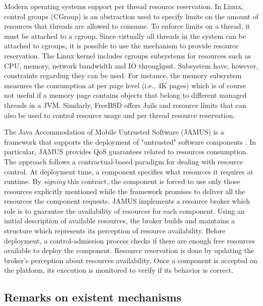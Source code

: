 Modern operating systems support per thread resource reservation.
In Linux, control groups (CGroup) \cite{Soltesz:2007:COS:1272998.1273025} is an abstraction used to specify limits on the amount of resources that threads are allowed to consume.
To enforce limits on a thread, it must be attached to a cgroup.
Since virtually all threads in the system can be attached to cgroups, it is possible to use the mechanism
to provide resource reservation.
The Linux kernel includes cgroups subsystems for resources such as CPU, memory, network bandwidth and IO throughput.
Subsystem have, however, constraints regarding they can be used.
For instance, the memory subsystem measures the consumption at per page level (i.e., 4K pages) which is of course not useful if a memory page contains objects that belong to different managed threads in a JVM. 
Similarly, FreeBSD offers Jails \cite{Kamp00jails:confining} and resource limits that can also be used to control resource usage and per thread resource reservation.

The Java Accommodation of Mobile Untrusted Software (JAMUS) is a framework that supports the deployment of "untrusted" software components \cite{JAMUS2002}.
In particular, JAMUS provides QoS guarantees related to resources consumption. 
The approach follows a contractual-based paradigm for dealing with resource control.
At deployment time, a component specifies what resources it requires at runtime.
By \textit{signing} this contract, the component is forced to use only those resources explicitly mentioned while the framework promises to deliver all the resources the component requests.
JAMUS implements a resource broker which role is to guarantee the availability of resources for each component.
Using an initial description of available resources, the broker builds and maintains a structure which represents its perception of resource availability.
Before deployment, a control-admission process checks if there are enough free resources available to deploy the component.
Resource reservation is done by updating the broker's perception about resources availability.
Once a component is accepted on the platform, its execution is monitored to verify if its behavior is correct.


\subsection{Remarks on existent mechanisms} \label{sec:discussion-related-work}

